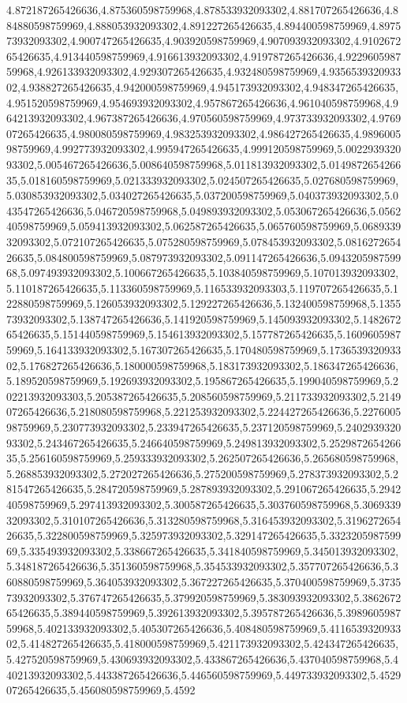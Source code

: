 4.872187265426636,4.875360598759968,4.878533932093302,4.881707265426636,4.884880598759969,4.888053932093302,4.891227265426635,4.894400598759969,4.897573932093302,4.900747265426635,4.903920598759969,4.907093932093302,4.910267265426635,4.913440598759969,4.916613932093302,4.919787265426636,4.922960598759968,4.926133932093302,4.929307265426635,4.932480598759969,4.935653932093302,4.938827265426635,4.942000598759969,4.945173932093302,4.948347265426635,4.951520598759969,4.954693932093302,4.957867265426636,4.961040598759968,4.964213932093302,4.967387265426636,4.970560598759969,4.973733932093302,4.976907265426635,4.980080598759969,4.983253932093302,4.986427265426635,4.989600598759969,4.992773932093302,4.995947265426635,4.999120598759969,5.002293932093302,5.005467265426636,5.008640598759968,5.011813932093302,5.014987265426635,5.018160598759969,5.021333932093302,5.024507265426635,5.027680598759969,5.030853932093302,5.034027265426635,5.037200598759969,5.040373932093302,5.043547265426636,5.046720598759968,5.049893932093302,5.053067265426636,5.056240598759969,5.059413932093302,5.062587265426635,5.065760598759969,5.068933932093302,5.072107265426635,5.075280598759969,5.078453932093302,5.081627265426635,5.084800598759969,5.087973932093302,5.091147265426636,5.094320598759968,5.097493932093302,5.100667265426635,5.103840598759969,5.107013932093302,5.110187265426635,5.113360598759969,5.116533932093303,5.119707265426635,5.122880598759969,5.126053932093302,5.129227265426636,5.132400598759968,5.135573932093302,5.138747265426636,5.141920598759969,5.145093932093302,5.148267265426635,5.151440598759969,5.154613932093302,5.157787265426635,5.160960598759969,5.164133932093302,5.167307265426635,5.170480598759969,5.173653932093302,5.176827265426636,5.180000598759968,5.183173932093302,5.186347265426636,5.189520598759969,5.192693932093302,5.195867265426635,5.199040598759969,5.202213932093303,5.205387265426635,5.208560598759969,5.211733932093302,5.214907265426636,5.218080598759968,5.221253932093302,5.224427265426636,5.227600598759969,5.230773932093302,5.233947265426635,5.237120598759969,5.240293932093302,5.243467265426635,5.246640598759969,5.249813932093302,5.252987265426635,5.256160598759969,5.259333932093302,5.262507265426636,5.265680598759968,5.268853932093302,5.272027265426636,5.275200598759969,5.278373932093302,5.281547265426635,5.284720598759969,5.287893932093302,5.291067265426635,5.294240598759969,5.297413932093302,5.300587265426635,5.303760598759968,5.306933932093302,5.310107265426636,5.313280598759968,5.316453932093302,5.319627265426635,5.322800598759969,5.325973932093302,5.329147265426635,5.332320598759969,5.335493932093302,5.338667265426635,5.341840598759969,5.345013932093302,5.348187265426636,5.351360598759968,5.354533932093302,5.357707265426636,5.360880598759969,5.364053932093302,5.367227265426635,5.370400598759969,5.373573932093302,5.376747265426635,5.379920598759969,5.383093932093302,5.386267265426635,5.389440598759969,5.392613932093302,5.395787265426636,5.398960598759968,5.402133932093302,5.405307265426636,5.408480598759969,5.411653932093302,5.414827265426635,5.418000598759969,5.421173932093302,5.424347265426635,5.427520598759969,5.430693932093302,5.433867265426636,5.437040598759968,5.440213932093302,5.443387265426636,5.446560598759969,5.449733932093302,5.452907265426635,5.456080598759969,5.4592